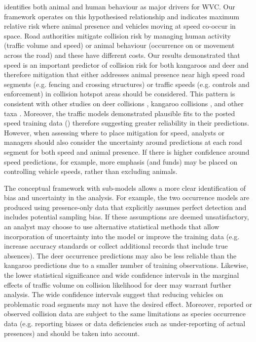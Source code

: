 \cite{form03} identifies both animal and human behaviour as major drivers for WVC.  Our framework operates on this hypothesised relationship and indicates maximum relative risk where animal presence and vehicles moving at speed co-occur in space.  Road authorities mitigate collision risk by managing human activity (traffic volume and speed) or animal behaviour (occurrence on or movement across the road) and these have different costs.  Our results demonstrated that speed is an important predictor of collision risk for both kangaroos and deer and therefore mitigation that either addresses animal presence near high speed road segments (e.g. fencing and crossing structures) or traffic speeds (e.g. controls and enforcement) in collision hotspot areas should be considered.  This pattern is consistent with other studies on deer collisions \citep[e.g.][]{gkri13,meis14,sudh09}, kangaroo collisions \citep[e.g.][]{rowd08}, and other taxa \citep[e.g.][]{guns11}.  Moreover, the traffic models demonstrated plausible fits to the posted speed training data () therefore suggesting greater reliability in their predictions.  However, when assessing where to place mitigation for speed, analysts or managers should also consider the uncertainty around predictions at each road segment for both speed and animal presence. If there is higher confidence around speed predictions, for example, more emphasis (and funds) may be placed on controlling vehicle speeds, rather than excluding animals.

The conceptual framework with sub-models allows a more clear identification of bias and uncertainty in the analysis.  For example, the two occurrence models are produced using presence-only data that explicitly assumes perfect detection and includes potential sampling bias.  If these assumptions are deemed unsatisfactory, an analyst may choose to use alternative statistical methods that allow incorporation of uncertainty into the model \citep[see][]{dora14} or improve the training data (e.g. increase accuracy standards or collect additional records that include true absences).  The deer occurrence predictions may also be less reliable than the kangaroo predictions due to a smaller number of training observations.  Likewise, the lower statistical significance and wide confidence intervals in the marginal effects of traffic volume on collision likelihood for deer may warrant further analysis. The wide confidence intervals suggest that reducing vehicles on problematic road segments may not have the desired effect.  Moreover, reported or observed collision data are subject to the same limitations as species occurrence data (e.g. reporting biases or data deficiencies such as under-reporting of actual presences) and should be taken into account.

